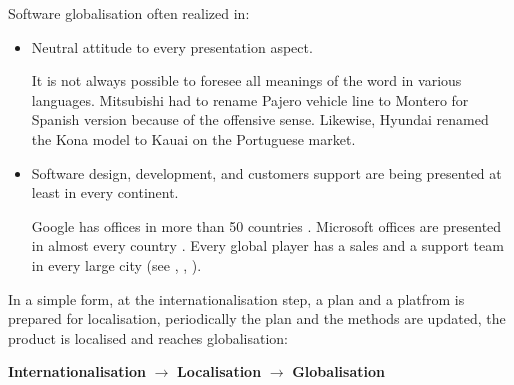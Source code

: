 Software globalisation often realized in:
\begin{itemize}
\item Neutral attitude to every presentation aspect.
  
It is not always possible to foresee all meanings of the word in various languages. Mitsubishi had to rename Pajero vehicle line to Montero for Spanish version because of the offensive sense. Likewise, Hyundai renamed the Kona model to Kauai on the Portuguese market.

\item Software design, development, and customers support are being presented at least in every continent.
  
Google has offices in more than 50 countries \cite{googleoffices}. Microsoft offices are presented in almost every country \cite{microsoftoffices}. Every global player has a sales and a support team in every large city (see \cite[Apple offices]{appleoffices}, \cite[SAP offices]{sapoffices}, \cite[Amazon offices]{amazonoffices}).
\end{itemize}

In a simple form, at the internationalisation step, a plan and a platfrom is prepared for localisation, periodically the plan and the methods are updated, the product is localised and reaches globalisation:
\begin{tcolorbox}
    \centering
    \textbf{Internationalisation} $\longrightarrow$ \textbf{Localisation} $\longrightarrow$ \textbf{Globalisation}
\end{tcolorbox}